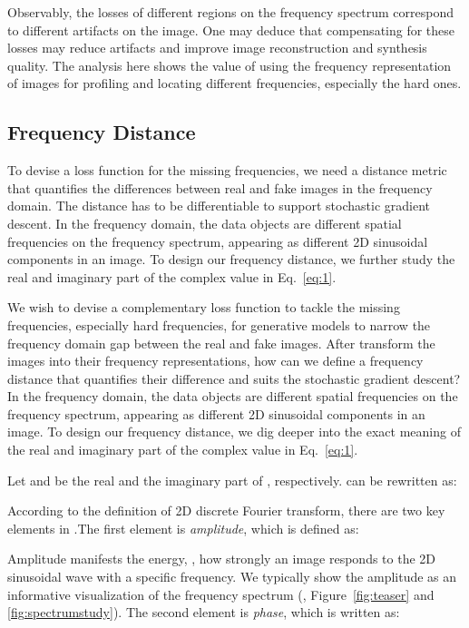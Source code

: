 \documentclass[10pt,twocolumn,letterpaper]{article}
\begin{document}
Observably, the losses of different regions on the frequency spectrum correspond to different artifacts on the image.
One may deduce that compensating for these losses may reduce artifacts and improve image reconstruction and synthesis quality.
The analysis here shows the value of using the frequency representation of images for profiling and locating different frequencies, especially the hard ones.





\subsection{Frequency Distance}
\label{sec:freqdist}

To devise a loss function for the missing frequencies, we need a distance metric that quantifies the differences between real and fake images in the frequency domain. The distance has to be differentiable to support stochastic gradient descent.
In the frequency domain, the data objects are different spatial frequencies on the frequency spectrum, appearing as different 2D sinusoidal components in an image.
To design our frequency distance, we further study the real and imaginary part of the complex value  in Eq.~\eqref{eq:1}.

We wish to devise a complementary loss function to tackle the missing frequencies, especially hard frequencies, for generative models to narrow the frequency domain gap between the real and fake images.
After transform the images into their frequency representations, how can we define a frequency distance that quantifies their difference and suits the stochastic gradient descent?
In the frequency domain, the data objects are different spatial frequencies on the frequency spectrum, appearing as different 2D sinusoidal components in an image.
To design our frequency distance, we dig deeper into the exact meaning of the real and imaginary part of the complex value  in Eq.~\eqref{eq:1}.
\fi 

Let  and  be the real and the imaginary part of , respectively.  can be rewritten as:

According to the definition of 2D discrete Fourier transform, there are two key elements in .The first element is \textit{amplitude}, which is defined as:

Amplitude manifests the energy, \ie, how strongly an image responds to the 2D sinusoidal wave with a specific frequency. We typically show the amplitude as an informative visualization of the frequency spectrum (\eg, Figure~\ref{fig:teaser} and \ref{fig:spectrumstudy}).
The second element is \textit{phase}, which is written as:
\end{document}
